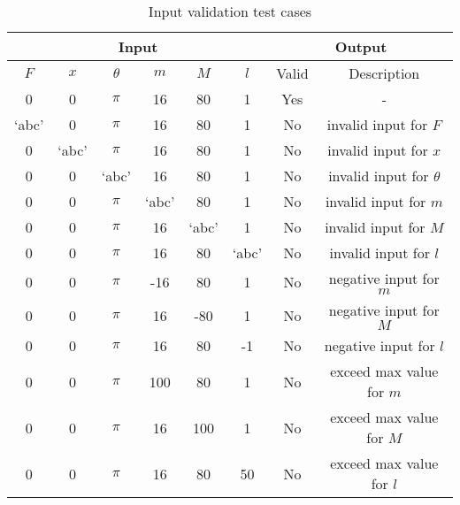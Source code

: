 \documentclass[12pt, titlepage]{article}
\begin{document}
\begin{table}[ht]
  \centering
  \caption{Input validation test cases} \label{table:input_constraints}
  \vspace*{2mm}
  \begin{tabular}{|c c c c c c|c|c|}
    \hline
    \multicolumn{6}{|c|}{Input} & \multicolumn{2}{c|}{Output}                                                                         \\ \hline
    $F$                         & $x$                         & $\theta$ & $m$   & $M$   & $l$   & Valid & Description                \\ \hline
    0                           & 0                           & $\pi$    & 16    & 80    & 1     & Yes   & -                          \\ \hline
    `abc'                       & 0                           & $\pi$    & 16    & 80    & 1     & No    & invalid input for $F$      \\ \hline
    0                           & `abc'                       & $\pi$    & 16    & 80    & 1     & No    & invalid input for $x$      \\ \hline
    0                           & 0                           & `abc'    & 16    & 80    & 1     & No    & invalid input for $\theta$ \\ \hline
    0                           & 0                           & $\pi$    & `abc' & 80    & 1     & No    & invalid input for $m$      \\ \hline
    0                           & 0                           & $\pi$    & 16    & `abc' & 1     & No    & invalid input for $M$      \\ \hline
    0                           & 0                           & $\pi$    & 16    & 80    & `abc' & No    & invalid input for $l$      \\ \hline
    0                           & 0                           & $\pi$    & -16   & 80    & 1     & No    & negative input for $m$     \\ \hline
    0                           & 0                           & $\pi$    & 16    & -80   & 1     & No    & negative input for $M$     \\ \hline
    0                           & 0                           & $\pi$    & 16    & 80    & -1    & No    & negative input for $l$     \\ \hline
    0                           & 0                           & $\pi$    & 100   & 80    & 1     & No    & exceed max value for $m$   \\ \hline
    0                           & 0                           & $\pi$    & 16    & 100   & 1     & No    & exceed max value for $M$   \\ \hline
    0                           & 0                           & $\pi$    & 16    & 80    & 50    & No    & exceed max value for $l$   \\ \hline
  \end{tabular}
\end{table}
\end{document}
